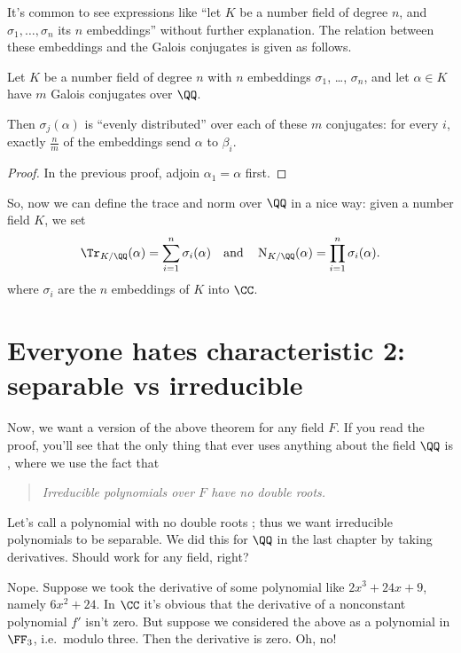 It's common to see expressions like ``let $K$ be a number field of degree $n$,
and $\sigma_1, \dots, \sigma_n$ its $n$ embeddings'' without further explanation.
The relation between these embeddings and the Galois conjugates is given as follows.
\begin{theorem}
	Let $K$ be a number field of degree $n$ with $n$ embeddings $\sigma_1$, \dots, $\sigma_n$,
	and let $\alpha \in K$ have $m$ Galois conjugates over $\QQ$. 

	Then $\sigma_j(\alpha)$ is ``evenly distributed'' over each of these $m$ conjugates:
	for every $i$, exactly $\frac nm$ of the embeddings send $\alpha$ to $\beta_i$.
\end{theorem}
\begin{proof}
	In the previous proof, adjoin $\alpha_1 = \alpha$ first.
\end{proof}

So, now we can define the trace and norm over $\QQ$ in a nice way:
given a number field $K$, we set
\[
	\Tr_{K/\QQ}(\alpha) = \sum_{i=1}^n \sigma_i(\alpha)
	\quad\text{and}\quad
	\Norm_{K/\QQ}(\alpha) = \prod_{i=1}^n \sigma_i(\alpha).
\]
where $\sigma_i$ are the $n$ embeddings of $K$ into $\CC$.

\section{Everyone hates characteristic 2: separable vs irreducible}
Now, we want a version of the above theorem for any field $F$.
If you read the proof, you'll see that the only thing that ever uses anything about the field $\QQ$
is , where we use the fact that
\begin{quote}
	\itshape Irreducible polynomials over $F$ have no double roots.
\end{quote}

Let's call a polynomial with no double roots ;
thus we want irreducible polynomials to be separable.
We did this for $\QQ$ in the last chapter by taking derivatives.
Should work for any field, right?

Nope.
Suppose we took the derivative of some polynomial like $2x^3 + 24x + 9$,
namely $6x^2 + 24$.
In $\CC$ it's obvious that the derivative of a nonconstant polynomial $f'$ isn't zero.
But suppose we considered the above as a polynomial in $\FF_3$, i.e.\ modulo three.
Then the derivative is zero.
Oh, no!

